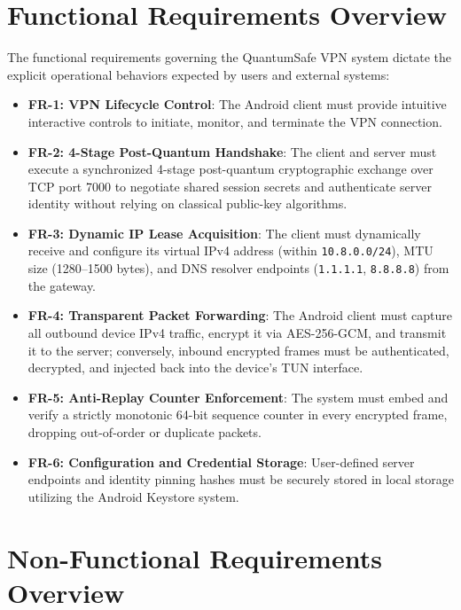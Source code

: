\section{Functional Requirements Overview}
\label{sec:functional_req_overview}

The functional requirements governing the QuantumSafe VPN system dictate the explicit operational behaviors expected by users and external systems:
\begin{itemize}
    \item \textbf{FR-1: VPN Lifecycle Control}: The Android client must provide intuitive interactive controls to initiate, monitor, and terminate the VPN connection.
    \item \textbf{FR-2: 4-Stage Post-Quantum Handshake}: The client and server must execute a synchronized 4-stage post-quantum cryptographic exchange over TCP port 7000 to negotiate shared session secrets and authenticate server identity without relying on classical public-key algorithms.
    \item \textbf{FR-3: Dynamic IP Lease Acquisition}: The client must dynamically receive and configure its virtual IPv4 address (within \texttt{10.8.0.0/24}), MTU size (1280--1500 bytes), and DNS resolver endpoints (\texttt{1.1.1.1}, \texttt{8.8.8.8}) from the gateway.
    \item \textbf{FR-4: Transparent Packet Forwarding}: The Android client must capture all outbound device IPv4 traffic, encrypt it via AES-256-GCM, and transmit it to the server; conversely, inbound encrypted frames must be authenticated, decrypted, and injected back into the device's TUN interface.
    \item \textbf{FR-5: Anti-Replay Counter Enforcement}: The system must embed and verify a strictly monotonic 64-bit sequence counter in every encrypted frame, dropping out-of-order or duplicate packets.
    \item \textbf{FR-6: Configuration and Credential Storage}: User-defined server endpoints and identity pinning hashes must be securely stored in local storage utilizing the Android Keystore system.
\end{itemize}

\section{Non-Functional Requirements Overview}
\label{sec:non_functional_req_overview}

